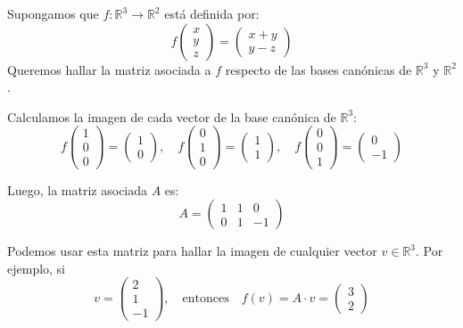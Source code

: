 \begin{ejemplo}
Supongamos que \(f: \mathbb{R}^3 \to \mathbb{R}^2\) está definida por:
\[
f\begin{pmatrix}x \\ y \\ z\end{pmatrix} = \begin{pmatrix}x+y \\ y - z\end{pmatrix}
\]
Queremos hallar la matriz asociada a \(f\) respecto de las bases canónicas de \(\mathbb{R}^3\) y \(\mathbb{R}^2\).

Calculamos la imagen de cada vector de la base canónica de \(\mathbb{R}^3\):
\[
f\begin{pmatrix}1 \\ 0 \\ 0\end{pmatrix} = \begin{pmatrix}1 \\ 0\end{pmatrix}, \quad
f\begin{pmatrix}0 \\ 1 \\ 0\end{pmatrix} = \begin{pmatrix}1 \\ 1\end{pmatrix}, \quad
f\begin{pmatrix}0 \\ 0 \\ 1\end{pmatrix} = \begin{pmatrix}0 \\ -1\end{pmatrix}
\]

Luego, la matriz asociada \(A\) es:
\[
A = \begin{pmatrix}
1 & 1 & 0 \\
0 & 1 & -1
\end{pmatrix}
\]

Podemos usar esta matriz para hallar la imagen de cualquier vector \(v \in \mathbb{R}^3\). Por ejemplo, si
\[
v = \begin{pmatrix}2 \\ 1 \\ -1\end{pmatrix}, \quad \text{entonces} \quad f(v) = A \cdot v = \begin{pmatrix}3 \\ 2\end{pmatrix}
\]
\end{ejemplo}

